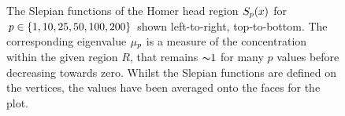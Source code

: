 \begin{figure}[htpb]
    \hfill
    \caption[
        Some Slepian functions of the Homer head region
    ]{
        The Slepian functions of the Homer head region \({S}_{p}(x)\) for \(p \in \{1, 10, 25, 50, 100, 200\}\) shown left-to-right, top-to-bottom.
        The corresponding eigenvalue \({\mu}_{p}\) is a measure of the concentration within the given region \(R\), that remains \({\thicksim}\num{1}\) for many \(p\) values before decreasing towards zero.
        Whilst the Slepian functions are defined on the vertices, the values have been averaged onto the faces for the plot.
    }\label{fig:chapter5_slepian_functions}
\end{figure}
